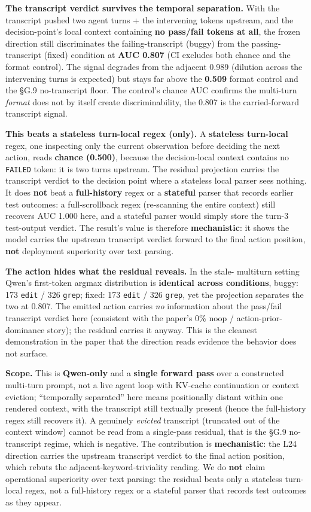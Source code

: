\documentclass[
  11pt,
  a4paper]{article}
\begin{document}
\textbf{The transcript verdict survives the temporal separation.} With
the transcript pushed two agent turns + the intervening tokens upstream,
and the decision-point's local context containing \textbf{no pass/fail
tokens at all}, the frozen direction still discriminates the
failing-transcript (buggy) from the passing-transcript (fixed) condition
at \textbf{AUC 0.807} (CI excludes both chance and the format control).
The signal degrades from the adjacent 0.989 (dilution across the
intervening turns is expected) but stays far above the \textbf{0.509}
format control and the \S{}G.9 no-transcript floor. The control's chance
AUC confirms the multi-turn \emph{format} does not by itself create
discriminability, the 0.807 is the carried-forward transcript signal.

\textbf{This beats a stateless turn-local regex (only).} A
\textbf{stateless turn-local} regex, one inspecting only the current
observation before deciding the next action, reads \textbf{chance
(0.500)}, because the decision-local context contains no \texttt{FAILED}
token: it is two turns upstream. The residual projection carries the
transcript verdict to the decision point where a stateless local parser
sees nothing. It does \textbf{not} beat a \textbf{full-history} regex or
a \textbf{stateful} parser that records earlier test outcomes: a
full-scrollback regex (re-scanning the entire context) still recovers
AUC 1.000 here, and a stateful parser would simply store the turn-3
test-output verdict. The result's value is therefore
\textbf{mechanistic}: it shows the model carries the upstream transcript
verdict forward to the final action position, \textbf{not} deployment
superiority over text parsing.

\textbf{The action hides what the residual reveals.} In the stale-
multiturn setting Qwen's first-token argmax distribution is
\textbf{identical across conditions}, buggy: 173 \texttt{edit} / 326
\texttt{grep}; fixed: 173 \texttt{edit} / 326 \texttt{grep}, yet the
projection separates the two at 0.807. The emitted action carries
\emph{no} information about the pass/fail transcript verdict here
(consistent with the paper's 0\% noop / action-prior-dominance story);
the residual carries it anyway. This is the cleanest demonstration in
the paper that the direction reads evidence the behavior does not
surface.

\textbf{Scope.} This is \textbf{Qwen-only} and a \textbf{single forward
pass} over a constructed multi-turn prompt, not a live agent loop with
KV-cache continuation or context eviction; ``temporally separated'' here
means positionally distant within one rendered context, with the
transcript still textually present (hence the full-history regex still
recovers it). A genuinely \emph{evicted} transcript (truncated out of
the context window) cannot be read from a single-pass residual, that is
the \S{}G.9 no-transcript regime, which is negative. The contribution is
\textbf{mechanistic}: the L24 direction carries the upstream transcript
verdict to the final action position, which rebuts the
adjacent-keyword-triviality reading. We do \textbf{not} claim
operational superiority over text parsing: the residual beats only a
stateless turn-local regex, not a full-history regex or a stateful
parser that records test outcomes as they appear.
\end{document}
